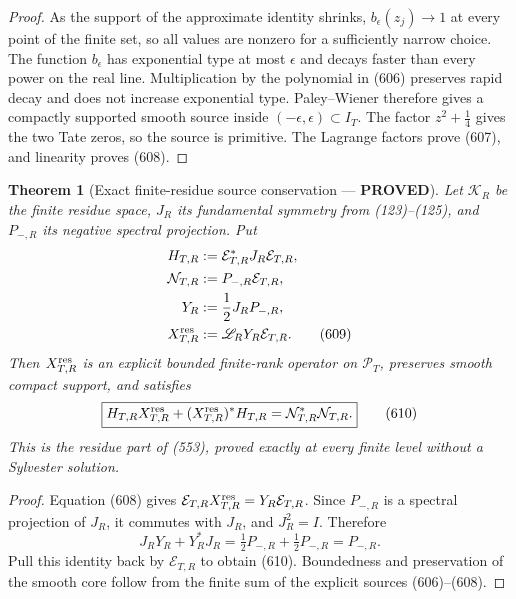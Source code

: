 \documentclass[11pt]{article}
\newtheorem{theorem}{Theorem}
\newcommand{\PROVED}{\textcolor{green!45!black}{\textbf{PROVED}}}
\begin{document}
\begin{proof}
As the support of the approximate identity shrinks,
\(b_\epsilon(z_j)\to1\) at every point of the finite set, so all values
are nonzero for a sufficiently narrow choice.  The function
\(b_\epsilon\) has exponential type at most \(\epsilon\) and decays faster
than every power on the real line.  Multiplication by the polynomial in
(606) preserves rapid decay and does not increase exponential type.
Paley--Wiener therefore gives a compactly supported smooth source inside
\((-\epsilon,\epsilon)\subset I_T\).  The factor
\(z^2+\frac14\) gives the two Tate zeros, so the source is primitive.
The Lagrange factors prove (607), and linearity proves (608).
\end{proof}

\begin{theorem}[Exact finite-residue source conservation --- \PROVED]
Let \(\mathscr K_R\) be the finite residue space, \(J_R\) its fundamental
symmetry from (123)--(125), and \(P_{-,R}\) its negative spectral
projection.  Put
\begin{align}
 H_{T,R}&:=\mathcal E_{T,R}^*J_R\mathcal E_{T,R},\notag\\
 \mathcal N_{T,R}&:=P_{-,R}\mathcal E_{T,R},\notag\\
 Y_R&:=\frac12J_RP_{-,R},\notag\\
 X_{T,R}^{\rm res}&:=\mathscr L_RY_R\mathcal E_{T,R}. \tag{609}
\end{align}
Then \(X_{T,R}^{\rm res}\) is an explicit bounded finite-rank operator on
\(\mathcal P_T\), preserves smooth compact support, and satisfies
\begin{equation}
 \boxed{
 H_{T,R}X_{T,R}^{\rm res}
 +(X_{T,R}^{\rm res})^*H_{T,R}
 =\mathcal N_{T,R}^*\mathcal N_{T,R}.}               \tag{610}
\end{equation}
This is the residue part of (553), proved exactly at every finite level
without a Sylvester solution.
\end{theorem}

\begin{proof}
Equation (608) gives
\(\mathcal E_{T,R}X_{T,R}^{\rm res}
 =Y_R\mathcal E_{T,R}\).  Since \(P_{-,R}\) is a spectral projection of
\(J_R\), it commutes with \(J_R\), and \(J_R^2=I\).  Therefore
\[
 J_RY_R+Y_R^*J_R
 =\tfrac12P_{-,R}+\tfrac12P_{-,R}=P_{-,R}.
\]
Pull this identity back by \(\mathcal E_{T,R}\) to obtain (610).
Boundedness and preservation of the smooth core follow from the finite sum
of the explicit sources (606)--(608).
\end{proof}
\end{document}
